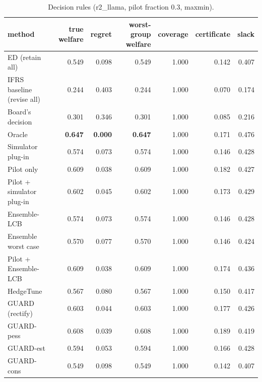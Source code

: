 \begin{table}[t]
\centering
\small
\begin{tabular}{lrrrrrr}
\toprule
method & true welfare & regret & worst-group welfare & coverage & certificate & slack \\
\midrule
ED (retain all) & 0.549 & 0.098 & 0.549 & 1.000 & 0.142 & 0.407 \\
IFRS baseline (revise all) & 0.244 & 0.403 & 0.244 & 1.000 & 0.070 & 0.174 \\
Board's decision & 0.301 & 0.346 & 0.301 & 1.000 & 0.085 & 0.216 \\
Oracle & \textbf{0.647} & \textbf{0.000} & \textbf{0.647} & 1.000 & 0.171 & 0.476 \\
Simulator plug-in & 0.574 & 0.073 & 0.574 & 1.000 & 0.146 & 0.428 \\
Pilot only & 0.609 & 0.038 & 0.609 & 1.000 & 0.182 & 0.427 \\
Pilot + simulator plug-in & 0.602 & 0.045 & 0.602 & 1.000 & 0.173 & 0.429 \\
Ensemble-LCB & 0.574 & 0.073 & 0.574 & 1.000 & 0.146 & 0.428 \\
Ensemble worst case & 0.570 & 0.077 & 0.570 & 1.000 & 0.146 & 0.424 \\
Pilot + Ensemble-LCB & 0.609 & 0.038 & 0.609 & 1.000 & 0.174 & 0.436 \\
HedgeTune & 0.567 & 0.080 & 0.567 & 1.000 & 0.150 & 0.417 \\
GUARD (rectify) & 0.603 & 0.044 & 0.603 & 1.000 & 0.177 & 0.426 \\
GUARD-pess & 0.608 & 0.039 & 0.608 & 1.000 & 0.189 & 0.419 \\
GUARD-est & 0.594 & 0.053 & 0.594 & 1.000 & 0.166 & 0.428 \\
GUARD-cons & 0.549 & 0.098 & 0.549 & 1.000 & 0.142 & 0.407 \\
\bottomrule
\end{tabular}
\caption{Decision rules (r2\_llama, pilot fraction 0.3, maxmin).}
\label{tab:methods-maxmin}
\end{table}
